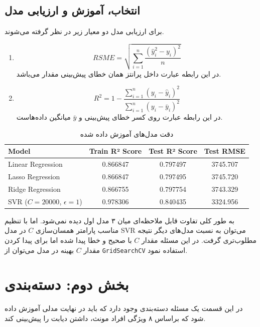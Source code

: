 \documentclass[11pt]{article}
\begin{document}
	\subsection{انتخاب، آموزش و ارزیابی مدل}
	برای ارزیابی مدل دو معیار زیر در نظر گرفته می‌شوند.
	\begin{enumerate}
		\item {} $$RSME = \sqrt{\sum_{i=1}^{n}\frac{(\hat{y}_i^2 - y_i)^2}{n}}$$
		در این رابطه عبارت داخل پرانتز همان خطای پیش‌بینی مقدار می‌باشد.
		\item {} $$R^2= 1 - \frac{\sum_{i=1}^{n}(y_i - \hat{y}_i)^2}{\sum_{i=1}^{n}(y_i - \bar{y}_i)^2}$$
		در این رابطه عبارت روی کسر خطای پیش‌بینی و $\bar{y}$ میانگین داده‌هاست.
	\end{enumerate}
	\begin{table}[h!]
		\caption{دقت مدل‌های آموزش داده شده}
		\begin{latin}
		\centering
		\begin{tabular}{|l|c|c|c|}
			\hline
			\textbf{Model} & \textbf{Train R² Score} & \textbf{Test R² Score} & \textbf{Test RMSE} \\ \hline
			Linear Regression  & 0.866847 & 0.797497 & 3745.707 \\ \hline
			Lasso Regression & 0.866847 & 0.797495 & 3745.720 \\ \hline
			Ridge Regression & 0.866755 & 0.797754 & 3743.329 \\ \hline
			SVR ($C=20000$, $\epsilon = 1$) & 0.978306 & 0.840435 & 3324.956 \\ \hline
		\end{tabular}
		\end{latin}
		\label{tab:regression_results}
	\end{table}
		به طور کلی تفاوت قابل ملاحظه‌ای میان ۳ مدل اول دیده نمی‌شود. اما با تنظیم مناسب پارامتر همسان‌سازی $C$ در مدل SVR می‌توان به نسبت مدل‌های دیگر نتیجه مطلوب‌تری گرفت. در این مسئله مقدار $C$ با صحیح و خطا پیدا شده اما برای پیدا کردن مقدار $C$ بهینه در مدل می‌توان از 
	\verb|GridSearchCV|
	استفاده نمود.
	\section{بخش دوم: دسته‌بندی}
	در این قسمت یک مسئله دسته‌بندی وجود دارد که باید در نهایت مدلی آموزش داده شود که براساس ۸ ویژگی افراد مونث، داشتن دیابت را پیش‌بینی کند.
\end{document}
